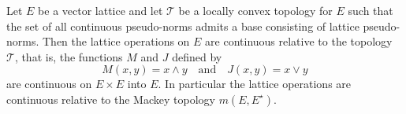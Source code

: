 Let $E$ be a vector lattice and let $\mathcal{T}$ be a locally convex topology for $E$ such that the set of all continuous pseudo-norms admits a base consisting of lattice pseudo-norms. Then the lattice operations on $E$ are continuous relative to the topology $\mathcal{T}$, that is, the functions $M$ and $J$ defined by $$M(x,y) = x \wedge y \quad \text{and} \quad J(x,y) = x \vee y$$ are continuous on $E \times E$ into $E$. In particular the lattice operations are continuous relative to the Mackey topology $m(E,E^\star)$.
